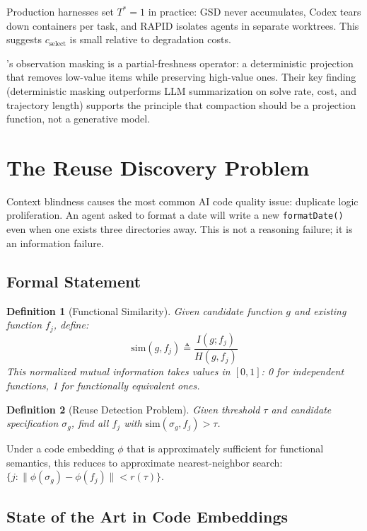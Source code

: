 \documentclass[11pt, a4paper, logo, copyright]{googledeepmind}
\newtheorem{definition}{Definition}[section]
\begin{document}
Production harnesses set $T^* = 1$ in practice: GSD never accumulates, Codex tears down containers per task, and RAPID isolates agents in separate worktrees. This suggests $c_{\text{select}}$ is small relative to degradation costs.

\citet{jetbrains2025complexity}'s observation masking is a partial-freshness operator: a deterministic projection that removes low-value items while preserving high-value ones. Their key finding (deterministic masking outperforms LLM summarization on solve rate, cost, and trajectory length) supports the principle that compaction should be a projection function, not a generative model.


\section{The Reuse Discovery Problem}
\label{sec:reuse}

Context blindness causes the most common AI code quality issue: duplicate logic proliferation. An agent asked to format a date will write a new \texttt{formatDate()} even when one exists three directories away. This is not a reasoning failure; it is an information failure.

\subsection{Formal Statement}

\begin{definition}[Functional Similarity]
Given candidate function $g$ and existing function $f_j$, define:
$$\text{sim}(g, f_j) \triangleq \frac{I(g; f_j)}{H(g, f_j)}$$
This normalized mutual information takes values in $[0,1]$: 0 for independent functions, 1 for functionally equivalent ones.
\end{definition}

\begin{definition}[Reuse Detection Problem]
Given threshold $\tau$ and candidate specification $\sigma_g$, find all $f_j$ with $\text{sim}(\sigma_g, f_j) > \tau$.
\end{definition}

Under a code embedding $\phi$ that is approximately sufficient for functional semantics, this reduces to approximate nearest-neighbor search: $\{j : \|\phi(\sigma_g) - \phi(f_j)\| < r(\tau)\}$.

\subsection{State of the Art in Code Embeddings}
\end{document}
